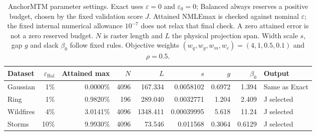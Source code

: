 \begin{table}[t]
\centering
\caption{AnchorMTM parameter settings. Exact uses $\varepsilon=0$ and $\varepsilon_0=0$; Balanced always reserves a positive budget, chosen by the fixed validation score $J$. Attained NMLEmax is checked against nominal $\varepsilon$; the fixed internal numerical allowance $10^{-7}$ does not relax that final check. A zero attained error is not a zero reserved budget. $N$ is raster length and $L$ the physical projection span. Width scale $s$, gap $g$ and slack $\beta_0$ follow fixed rules. Objective weights $(w_q,w_g,w_m,w_e)=(4,1,0.5,0.1)$ and $\rho=0.5$.}
\label{tab:anchor-parameters-final}
\small
\setlength{\tabcolsep}{4pt}
\begin{tabular}{lrrrrrrrl}
\toprule
Dataset & $\varepsilon_{\mathrm{Bal}}$ & Attained max & $N$ & $L$ & $s$ & $g$ & $\beta_0$ & Output \\
\midrule
Gaussian & 1\% & 0.0000\% & 4096 & 167.334 & 0.0058102 & 0.6972 & 1.394 & Same as Exact \\
Ring & 1\% & 0.9820\% & 196 & 289.040 & 0.0032771 & 1.204 & 2.409 & J selected \\
Wildfires & 4\% & 3.0141\% & 4096 & 1348.411 & 0.00039995 & 5.618 & 11.24 & J selected \\
Storms & 10\% & 9.9930\% & 4096 & 73.546 & 0.011568 & 0.3064 & 0.6129 & J selected \\
\bottomrule
\end{tabular}
\end{table}
